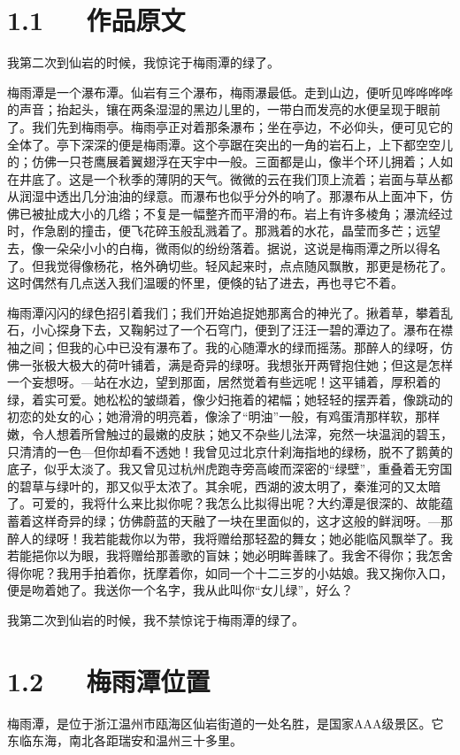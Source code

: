 \documentclass[letterpaper,12pt,english]{sphinxmanual}
\begin{document}
\section{1.1   作品原文}
\label{\detokenize{p01_u6563_u6587/_u6731_u81ea_u6e05-_u6885_u96e8_u6f6d_u7684_u7eff:id3}}
我第二次到仙岩的时候，我惊诧于梅雨潭的绿了。

梅雨潭是一个瀑布潭。仙岩有三个瀑布，梅雨瀑最低。走到山边，便听见哗哗哗哗的声音；抬起头，镶在两条湿湿的黑边儿里的，一带白而发亮的水便呈现于眼前了。我们先到梅雨亭。梅雨亭正对着那条瀑布；坐在亭边，不必仰头，便可见它的全体了。亭下深深的便是梅雨潭。这个亭踞在突出的一角的岩石上，上下都空空儿的；仿佛一只苍鹰展着翼翅浮在天宇中一般。三面都是山，像半个环儿拥着；人如在井底了。这是一个秋季的薄阴的天气。微微的云在我们顶上流着；岩面与草丛都从润湿中透出几分油油的绿意。而瀑布也似乎分外的响了。那瀑布从上面冲下，仿佛已被扯成大小的几绺；不复是一幅整齐而平滑的布。岩上有许多棱角；瀑流经过时，作急剧的撞击，便飞花碎玉般乱溅着了。那溅着的水花，晶莹而多芒；远望去，像一朵朵小小的白梅，微雨似的纷纷落着。据说，这说是梅雨潭之所以得名了。但我觉得像杨花，格外确切些。轻风起来时，点点随风飘散，那更是杨花了。这时偶然有几点送入我们温暖的怀里，便倏的钻了进去，再也寻它不着。

梅雨潭闪闪的绿色招引着我们；我们开始追捉她那离合的神光了。揪着草，攀着乱石，小心探身下去，又鞠躬过了一个石穹门，便到了汪汪一碧的潭边了。瀑布在襟袖之间；但我的心中已没有瀑布了。我的心随潭水的绿而摇荡。那醉人的绿呀，仿佛一张极大极大的荷叶铺着，满是奇异的绿呀。我想张开两臂抱住她；但这是怎样一个妄想呀。—站在水边，望到那面，居然觉着有些远呢！这平铺着，厚积着的绿，着实可爱。她松松的皱缬着，像少妇拖着的裙幅；她轻轻的摆弄着，像跳动的初恋的处女的心；她滑滑的明亮着，像涂了“明油”一般，有鸡蛋清那样软，那样嫩，令人想着所曾触过的最嫩的皮肤；她又不杂些儿法滓，宛然一块温润的碧玉，只清清的一色—但你却看不透她！我曾见过北京什刹海指地的绿杨，脱不了鹅黄的底子，似乎太淡了。我又曾见过杭州虎跑寺旁高峻而深密的“绿壁”，重叠着无穷国的碧草与绿叶的，那又似乎太浓了。其余呢，西湖的波太明了，秦淮河的又太暗了。可爱的，我将什么来比拟你呢？我怎么比拟得出呢？大约潭是很深的、故能蕴蓄着这样奇异的绿；仿佛蔚蓝的天融了一块在里面似的，这才这般的鲜润呀。—那醉人的绿呀！我若能裁你以为带，我将赠给那轻盈的舞女；她必能临风飘举了。我若能挹你以为眼，我将赠给那善歌的盲妹；她必明眸善睐了。我舍不得你；我怎舍得你呢？我用手拍着你，抚摩着你，如同一个十二三岁的小姑娘。我又掬你入口，便是吻着她了。我送你一个名字，我从此叫你“女儿绿”，好么？

我第二次到仙岩的时候，我不禁惊诧于梅雨潭的绿了。


\section{1.2   梅雨潭位置}
\label{\detokenize{p01_u6563_u6587/_u6731_u81ea_u6e05-_u6885_u96e8_u6f6d_u7684_u7eff:id4}}
梅雨潭，是位于浙江温州市瓯海区仙岩街道的一处名胜，是国家AAA级景区。它东临东海，南北各距瑞安和温州三十多里。
\end{document}
